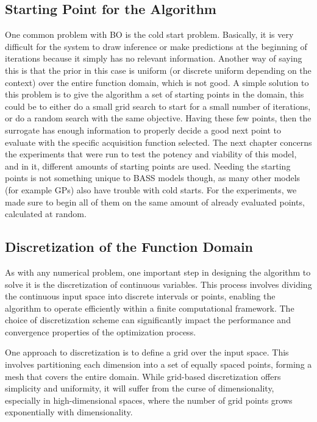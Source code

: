\subsection{Starting Point for the Algorithm}

One common problem with BO is the cold start problem. Basically, it is very difficult for the system to draw inference or make predictions at the beginning of iterations because it simply has no relevant information. Another way of saying this is that the prior in this case is uniform (or discrete uniform depending on the context) over the entire function domain, which is not good. A simple solution to this problem is to give the algorithm a set of starting points in the domain, this could be to either do a small grid search to start for a small number of iterations, or do a random search with the same objective. Having these few points, then the surrogate has enough information to properly decide a good next point to evaluate with the specific acquisition function selected. The next chapter concerns the experiments that were run to test the potency and viability of this model, and in it, different amounts of starting points are used. Needing the starting points is not something unique to BASS models though, as many other models (for example GPs) also have trouble with cold starts. For the experiments, we made sure to begin all of them on the same amount of already evaluated points, calculated at random. 

\subsection{Discretization of the Function Domain}

As with any numerical problem, one important step in designing the algorithm to solve it is the discretization of continuous variables. This process involves dividing the continuous input space into discrete intervals or points, enabling the algorithm to operate efficiently within a finite computational framework. The choice of discretization scheme can significantly impact the performance and convergence properties of the optimization process.

One approach to discretization is to define a grid over the input space. This involves partitioning each dimension into a set of equally spaced points, forming a mesh that covers the entire domain. While grid-based discretization offers simplicity and uniformity, it will suffer from the curse of dimensionality, especially in high-dimensional spaces, where the number of grid points grows exponentially with dimensionality.

